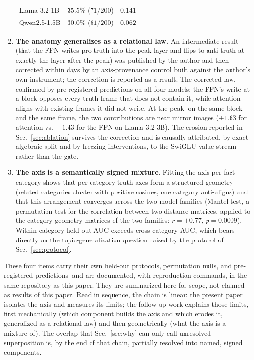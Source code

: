 \documentclass[11pt]{article}
\begin{document}
\begin{enumerate}
\begin{table}[H]
\begin{tabular}{lcc}
Llama-3.2-1B & $35.5\%$ ($71/200$) & $0.141$ \\
Qwen2.5-1.5B & $30.0\%$ ($61/200$) & $0.062$ \\
\bottomrule
\end{tabular}
\end{table}
\item \textbf{The anatomy generalizes as a relational law.} An intermediate
result (that the FFN writes pro-truth into the peak layer and flips to
anti-truth at exactly the layer after the peak) was published by the author
and then corrected within days by an axis-provenance control built against
the author's own instrument; the correction is reported as a result. The
corrected law, confirmed by pre-registered predictions on all four models:
the FFN's write at a block opposes every truth frame that does not contain
it, while attention aligns with existing frames it did not write. At the
peak, on the same block and the same frame, the two contributions are near
mirror images ($+1.63$ for attention vs.\ $-1.43$ for the FFN on
Llama-3.2-3B). The erosion reported in Sec.~\ref{sec:ablation} survives the
correction and is causally attributed, by exact algebraic split and by
freezing interventions, to the SwiGLU value stream rather than the gate.
\item \textbf{The axis is a semantically signed mixture.} Fitting the axis
per fact category shows that per-category truth axes form a structured
geometry (related categories cluster with positive cosines, one category
anti-aligns) and that this arrangement converges across the two model
families (Mantel test, a permutation test for the correlation between two distance
matrices, applied to the category-geometry matrices of the two families:
$r = +0.77$, $p = 0.0009$). Within-category held-out AUC exceeds
cross-category AUC, which bears directly on the topic-generalization question
raised by the protocol of Sec.~\ref{sec:protocol}.
\end{enumerate}

These four items carry their own held-out protocols, permutation nulls, and
pre-registered predictions, and are documented, with reproduction commands,
in the same repository as this paper. They are summarized here for scope, not
claimed as results of this paper. Read in sequence, the chain is linear: the
present paper isolates the axis and measures its limits; the follow-up work
explains those limits, first mechanically (which component builds the axis
and which erodes it, generalized as a relational law) and then geometrically
(what the axis is a mixture of). The overlap that Sec.~\ref{sec:why} can only
call unresolved superposition is, by the end of that chain, partially
resolved into named, signed components.
\end{document}
